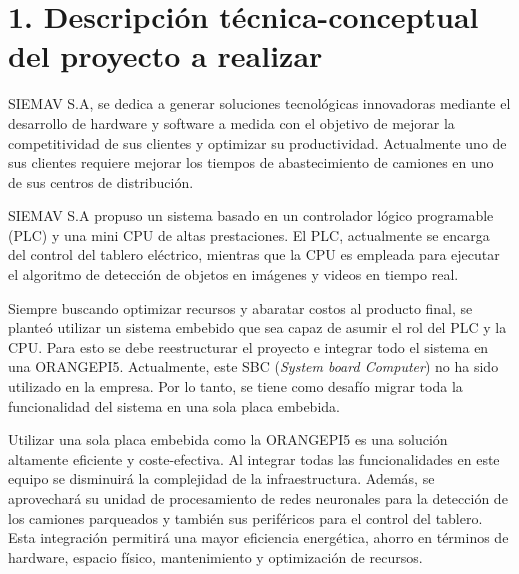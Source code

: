 \documentclass[
11pt, %
]{charter}
\begin{document}
\section{1. Descripción técnica-conceptual del proyecto a realizar}
\label{sec:descripcion}

SIEMAV S.A, se dedica a generar soluciones tecnológicas innovadoras mediante el desarrollo de hardware y software a medida con el objetivo de mejorar la competitividad de sus clientes y optimizar su productividad. Actualmente uno de sus clientes requiere mejorar los tiempos de abastecimiento de camiones en uno de sus centros de distribución. 

SIEMAV S.A propuso un sistema basado en un controlador lógico programable (PLC) y una mini CPU de altas prestaciones. El PLC, actualmente se encarga del control del tablero eléctrico, mientras que la CPU es empleada para ejecutar el algoritmo de detección de objetos en imágenes y videos en tiempo real.

Siempre buscando optimizar recursos y abaratar costos al producto final, se planteó utilizar un sistema embebido que sea capaz de asumir el rol del PLC y la CPU. Para esto se debe reestructurar el proyecto e integrar todo el sistema en una ORANGEPI5. Actualmente, este SBC (\textit{System board Computer}) no ha sido utilizado en la empresa. Por lo tanto, se tiene como desafío migrar toda la funcionalidad del sistema en una sola placa embebida. 

Utilizar una sola placa embebida como la ORANGEPI5 es una solución altamente eficiente y coste-efectiva. Al integrar todas las funcionalidades en este equipo se disminuirá la complejidad de la infraestructura. Además,  se aprovechará su unidad de procesamiento de redes neuronales para la detección de los camiones parqueados y también sus periféricos para el control del tablero. Esta integración permitirá  una mayor eficiencia energética, ahorro en términos de hardware, espacio físico, mantenimiento y optimización de recursos. 
\end{document}
